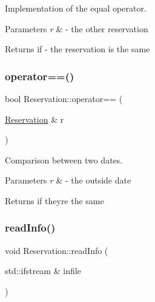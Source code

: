 Implementation of the equal operator. 


\begin{DoxyParams}{Parameters}
{\em r} & -\/ the other reservation \\
\hline
\end{DoxyParams}
\begin{DoxyReturn}{Returns}
if -\/ the reservation is the same 
\end{DoxyReturn}
\mbox{\label{class_reservation_a228b1145e4b553c2f98d958a84de5ac1}} 
\subsubsection{\texorpdfstring{operator==()}{operator==()}\hspace{0.1cm}{\footnotesize\ttfamily [2/2]}}
{\footnotesize\ttfamily bool Reservation\+::operator== (\begin{DoxyParamCaption}\item[{\mbox{\hyperlink{class_reservation}{Reservation}} \&}]{r }\end{DoxyParamCaption})}



Comparison between two dates. 


\begin{DoxyParams}{Parameters}
{\em r} & -\/ the outside date \\
\hline
\end{DoxyParams}
\begin{DoxyReturn}{Returns}
if they\textquotesingle{}re the same 
\end{DoxyReturn}
\mbox{\label{class_reservation_acff32024a350c2156af9f74522c59b7b}} 
\subsubsection{\texorpdfstring{read\+Info()}{readInfo()}}
{\footnotesize\ttfamily void Reservation\+::read\+Info (\begin{DoxyParamCaption}\item[{std\+::ifstream \&}]{infile }\end{DoxyParamCaption})\hspace{0.3cm}{\ttfamily [virtual]}}



